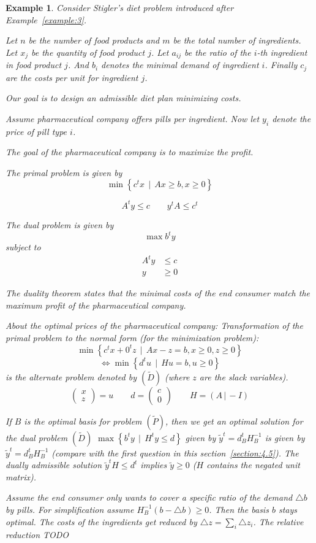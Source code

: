 \documentclass[a4paper]{article}
\numberwithin{lecref}{section}
\newcounter{exercises}
\newtheorem{example}[exercises]{Example}
\newcommand{\SetDef}[2]{\left\{#1\,\mid\,#2\right\}}
\begin{document}
\begin{example}
	Consider Stigler's diet problem introduced after Example~\ref{example:3}.

	Let $n$ be the number of food products and $m$ be the total number of ingredients.
	Let $x_j$ be the quantity of food product $j$.
	Let $a_{ij}$ be the ratio of the $i$-th ingredient in food product $j$.
	And $b_i$ denotes the minimal demand of ingredient $i$.
	Finally $c_j$ are the costs per unit for ingredient $j$.

	Our goal is to design an admissible diet plan minimizing costs.

	Assume pharmaceutical company offers pills per ingredient.
	Now let $y_i$ denote the price of pill type $i$.

	The goal of the pharmaceutical company is to maximize the profit.

	The primal problem is given by
	\[ \min\SetDef{c^t x}{Ax \geq b, x \geq 0} \]

	\[ A^t y \leq c \qquad y^t A \leq c^t \]

	The dual problem is given by
	\[ \max b^t y \]
	subject to
	\begin{align*}
		A^t y &\leq c \\
		y &\geq 0
	\end{align*}

	The duality theorem states that the minimal costs of the end consumer match the maximum profit of the pharmaceutical company.

	About the optimal prices of the pharmaceutical company:
	Transformation of the primal problem to the normal form (for the minimization problem):
	\[ \min\SetDef{c^tx + 0^t z}{Ax - z = b, x \geq 0, z \geq 0} \]
	\[ \iff \min\SetDef{d^t u}{Hu = b, u \geq 0} \]
	is the alternate problem denoted by $(\tilde D)$ (where $z$ are the slack variables).
	\[ \begin{pmatrix} x \\ z \end{pmatrix} = u \qquad d = \begin{pmatrix} c \\ 0 \end{pmatrix} \qquad H = (A \,|\, -I) \]

	If $B$ is the optimal basis for problem $(\tilde P)$, then we get an optimal solution for the dual problem $(\tilde D)$ $\max\SetDef{b^ty}{H^t y \leq d}$ given by $\tilde y^t = d_B^t H_B^{-1}$ is given by $\tilde y^t = d_B^t H_B^{-1}$ (compare with the first question in this section~\ref{section:4.5}). The dually admissible solution $\tilde y^t H \leq d^t$ implies $\tilde y \geq 0$ ($H$ contains the negated unit matrix).

	Assume the end consumer only wants to cover a specific ratio of the demand $\triangle b$ by pills.
	For simplification assume $H_B^{-1}(b - \triangle b) \geq 0$. Then the basis $b$ stays optimal.
	The costs of the ingredients get reduced by $\triangle z = \sum_i \triangle z_i$.
	The relative reduction
	TODO
\end{example}
\end{document}
